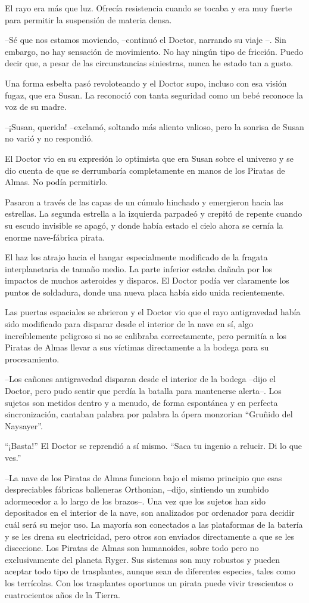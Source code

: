 El rayo era más que luz. Ofrecía resistencia cuando se tocaba y era muy fuerte para permitir la suspensión de materia densa.

--Sé que nos estamos moviendo, --continuó el Doctor, narrando su viaje --. Sin embargo, no hay sensación de movimiento. No hay ningún tipo de fricción. Puedo decir que, a pesar de las circunstancias siniestras, nunca he estado tan a gusto.

Una forma esbelta pasó revoloteando y el Doctor supo, incluso con esa visión fugaz, que era Susan. La reconoció con tanta seguridad como un bebé reconoce la voz de su madre.

--¡Susan, querida! --exclamó, soltando más aliento valioso, pero la sonrisa de Susan no varió y no respondió.

El Doctor vio en su expresión lo optimista que era Susan sobre el universo y se dio cuenta de que se derrumbaría completamente en manos de los Piratas de Almas. No podía permitirlo.

Pasaron a través de las capas de un cúmulo hinchado y emergieron hacia las estrellas. La segunda estrella a la izquierda parpadeó y crepitó de repente cuando su escudo invisible se apagó, y donde había estado el cielo ahora se cernía la enorme nave-fábrica pirata.

El haz los atrajo hacia el hangar especialmente modificado de la fragata interplanetaria de tamaño medio. La parte inferior estaba dañada por los impactos de muchos asteroides y disparos. El Doctor podía ver claramente los puntos de soldadura, donde una nueva placa había sido unida recientemente.

Las puertas espaciales se abrieron y el Doctor vio que el rayo antigravedad había sido modificado para disparar desde el interior de la nave en sí, algo increíblemente peligroso si no se calibraba correctamente, pero permitía a los Piratas de Almas llevar a sus víctimas directamente a la bodega para su procesamiento.

--Los cañones antigravedad disparan desde el interior de la bodega --dijo el Doctor, pero pudo sentir que perdía la batalla para mantenerse alerta--. Los sujetos son metidos dentro y a menudo, de forma espontánea y en perfecta sincronización, cantaban palabra por palabra la ópera monzorian ``Gruñido del Naysayer''.

``¡Basta!'' El Doctor se reprendió a sí mismo. ``Saca tu ingenio a relucir. Di lo que ves.''

--La nave de los Piratas de Almas funciona bajo el mismo principio que esas despreciables fábricas balleneras Orthonian, --dijo, sintiendo un zumbido adormecedor a lo largo de los brazos--. Una vez que los sujetos han sido depositados en el interior de la nave, son analizados por ordenador para decidir cuál será su mejor uso. La mayoría son conectados a las plataformas de la batería y se les drena su electricidad, pero otros son enviados directamente a que se les diseccione. Los Piratas de Almas son humanoides, sobre todo pero no exclusivamente del planeta Ryger. Sus sistemas son muy robustos y pueden aceptar todo tipo de trasplantes, aunque sean de diferentes especies, tales como los terrícolas. Con los trasplantes oportunos un pirata puede vivir trescientos o cuatrocientos años de la Tierra.

